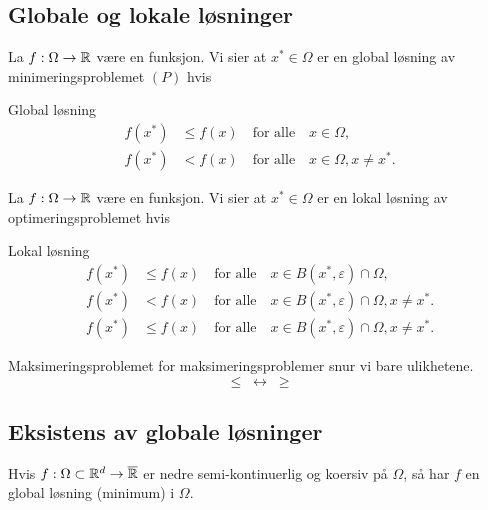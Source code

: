 \documentclass[11pt, a4paper]{article}
\begin{document}
\subsection{Globale og lokale løsninger}

La $f: \Omega \to \mathbb{R}$ være en funksjon. Vi sier at $x^* \in \Omega$ er en global løsning av minimeringsproblemet \((P)\) hvis

\begin{definition}{Global løsning}{}
    \begin{align*}
        f(x^*) & \leq f(x) \quad \text{for alle} \quad x \in \Omega, \tag{Global løsning}                 \\
        f(x^*) & < f(x) \quad \text{for alle} \quad x \in \Omega, x \neq x^*. \tag{Streng global løsning}
    \end{align*}
\end{definition}

La $f: \Omega \to \mathbb{R}$ være en funksjon. Vi sier at $x^* \in \Omega$ er en lokal løsning av optimeringsproblemet hvis

\begin{definition}{Lokal løsning}{}
    \begin{align*}
        f(x^*) & \leq f(x) \quad \text{for alle} \quad x \in B(x^*, \varepsilon) \cap \Omega, \tag{Lokal løsning}                     \\
        f(x^*) & < f(x) \quad \text{for alle} \quad x \in B(x^*, \varepsilon) \cap \Omega, x \neq x^*. \tag{Streng lokal løsning}     \\
        f(x^*) & \leq f(x) \quad \text{for alle} \quad x \in B(x^*, \varepsilon) \cap \Omega, x \neq x^*. \tag{Isolert lokal løsning}
    \end{align*}
\end{definition}

\begin{remark}{Maksimeringsproblemet}{}
    for maksimeringsproblemer snur vi bare ulikhetene.
    \[
        \leq \; \leftrightarrow \; \geq
    \]
\end{remark}

\subsection*{Eksistens av globale løsninger}

Hvis $f: \Omega \subset \mathbb{R}^d \to \overline{\mathbb{R}}$ er nedre semi-kontinuerlig og koersiv på $\Omega$, så har $f$ en global løsning (minimum) i $\Omega$.
\end{document}
